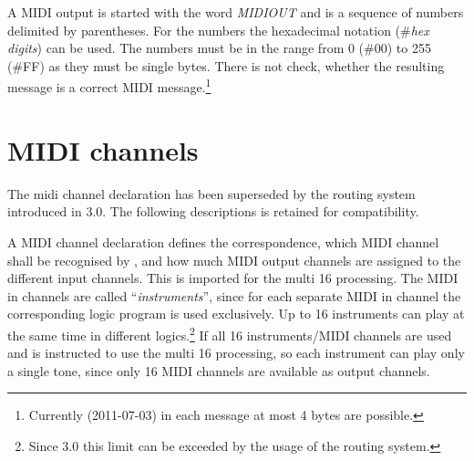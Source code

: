 A MIDI output is started with the word \textit{MIDIOUT}
and is a sequence of numbers delimited by parentheses. For the numbers
the hexadecimal notation (\#\textit{hex digits}) can be used. The
numbers must be in the range from 0 (\#00) to 255 (\#FF) as they must
be single bytes. There is not check, whether the resulting message is
a correct MIDI message.\footnote{Currently (2011-07-03) in each message at most 4 bytes are possible.}

\iffalse
MIDI-Ausgaben werden mit dem Wort {\it MIDIOUT}\index{MIDIOUT}
 eingeleitet und
sind eine eingeklammerte Folge von Zahlen. Bei Zahlen ist die sedezimale
Schreibweise zulässig (\#{\it ziffern}). Die Zahlen
müssen im Bereich von 0 bis 255 liegen, also Bytes sein. Es erfolgt keine
Kontrolle, ob es sich um eine sinnvolle MIDI-Nachricht handelt.
\fi



\chapter{MIDI channels}\label{cha:midi-kanale}
\label{MIDICHANNEL}

The midi channel declaration has been superseded by the routing system
introduced in \mutabor{} 3.0. The following descriptions is retained
for compatibility.

A MIDI channel declaration defines the correspondence, which MIDI
channel shall be recognised by \mutabor{}, and how much MIDI output
channels are assigned to the different input channels. This is
imported for the multi 16 processing. The
MIDI in channels are called “\textit{instruments}”, since for each separate
MIDI in channel the corresponding logic program is used
exclusively. Up to 16 instruments can play at the same time in
different logics.\footnote{Since \mutabor{} 3.0 this limit can be
  exceeded by the usage of the routing system.} If all 16
instruments/MIDI channels are used and \mutabor{} is instructed to use
the multi 16 processing, so each instrument can play only a single
tone, since only 16 MIDI channels are available as output channels. 

